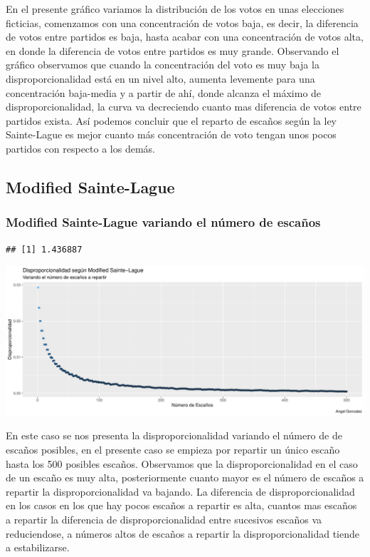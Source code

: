 \documentclass[12pt,a4paper,]{book}
\numberwithin{dummy}{section}
\theoremstyle{ocrenumbox}
\theoremstyle{blacknumex}
\theoremstyle{blacknumbox}
\theoremstyle{ocrenum}
\theoremstyle{ocrenum}
\begin{document}
En el presente gráfico variamos la distribución de los votos en unas
elecciones ficticias, comenzamos con una concentración de votos baja, es
decir, la diferencia de votos entre partidos es baja, hasta acabar con
una concentración de votos alta, en donde la diferencia de votos entre
partidos es muy grande. Observando el gráfico observamos que cuando la
concentración del voto es muy baja la disproporcionalidad está en un
nivel alto, aumenta levemente para una concentración baja-media y a
partir de ahí, donde alcanza el máximo de disproporcionalidad, la curva
va decreciendo cuanto mas diferencia de votos entre partidos exista. Así
podemos concluir que el reparto de escaños según la ley Sainte-Lague es
mejor cuanto más concentración de voto tengan unos pocos partidos con
respecto a los demás.

\hypertarget{modified-sainte-lague}{%
\subsection{Modified Sainte-Lague}\label{modified-sainte-lague}}

\hypertarget{modified-sainte-lague-variando-el-nuxfamero-de-escauxf1os}{%
\subsubsection{Modified Sainte-Lague variando el número de
escaños}\label{modified-sainte-lague-variando-el-nuxfamero-de-escauxf1os}}

\begin{verbatim}
## [1] 1.436887
\end{verbatim}

\begin{center}\includegraphics[width=0.95\linewidth]{figurasR/unnamed-chunk-19-1} \end{center}

En este caso se nos presenta la disproporcionalidad variando el número
de de escaños posibles, en el presente caso se empieza por repartir un
único escaño hasta los 500 posibles escaños. Observamos que la
disproporcionalidad en el caso de un escaño es muy alta, posteriormente
cuanto mayor es el número de escaños a repartir la disproporcionalidad
va bajando. La diferencia de disproporcionalidad en los casos en los que
hay pocos escaños a repartir es alta, cuantos mas escaños a repartir la
diferencia de disproporcionalidad entre sucesivos escaños va
reduciendose, a números altos de escaños a repartir la
disproporcionalidad tiende a estabilizarse.
\end{document}
